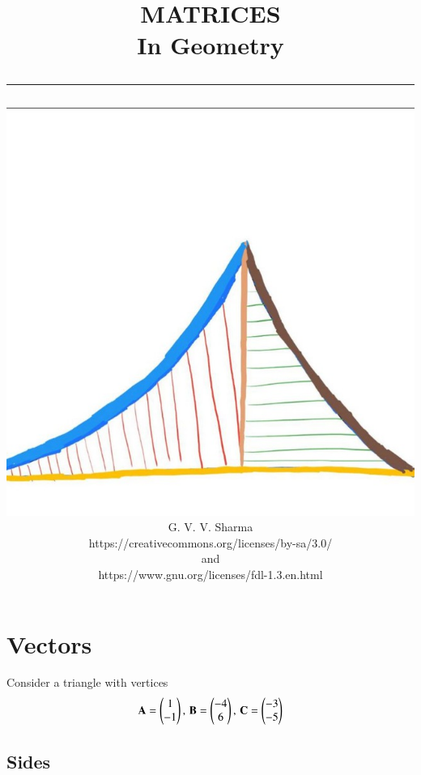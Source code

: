 \documentclass[journal]{IEEEtran}
\begin{document}

\onecolumn


\title{
	\begin{flushleft}
	MATRICES \\ In Geometry
	\\
\rule{0.4\columnwidth}{0.4pt}
\end{flushleft}
}
\author{
\vspace{7cm}
	\begin{flushleft}
\includegraphics[width=0.2\columnwidth]{figs/logo.jpg}
\\
		{	\huge G. V. V. Sharma}
		\\
\vspace{1cm}
https://creativecommons.org/licenses/by-sa/3.0/
\\
and
\\
https://www.gnu.org/licenses/fdl-1.3.en.html
	\end{flushleft}
}
\maketitle

\newpage


\tableofcontents

\newpage
\twocolumn


\renewcommand{\thefigure}{\theenumi}
\renewcommand{\thetable}{\theenumi}


\section{Vectors}
Consider a triangle with vertices
		\begin{align}
			\label{eq:tri-pts}
			\mathbf{A} = \begin{pmatrix}1 \\ -1\end{pmatrix},\,
			\mathbf{B} = \begin{pmatrix}-4 \\ 6\end{pmatrix},\,
			\mathbf{C} = \begin{pmatrix}-3 \\ -5\end{pmatrix}
		\end{align}
\subsection{Sides}

\newpage
\end{document}
